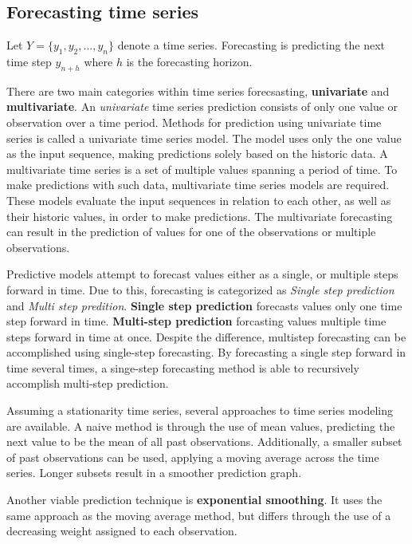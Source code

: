 \subsection{Forecasting time series}
\label{section:B&T:forecasting-time-series}
Let  $Y = \{y_1, y_2, ..., y_n\}$ denote a time series.
Forecasting is predicting the next time step $y_{n+h}$ where $h$ is the forecasting horizon.

There are two main categories within time series forecsasting, \textbf{univariate} and \textbf{multivariate}. 
An \textit{univariate} time series prediction consists of only one value or observation over a time period.
Methods for prediction using univariate time series is called a univariate time series model.
The model uses only the one value as the input sequence, making predictions solely based on the historic data.
A multivariate time series is a set of multiple values spanning a period of time.
To make predictions with such data, multivariate time series models are required.
These models evaluate the input sequences in relation to each other, as well as their historic values, in order to make predictions.
The multivariate forecasting can result in the prediction of values for one of the observations or multiple observations.


Predictive models attempt to forecast values either as a single, or multiple steps forward in time.
Due to this, forecasting is categorized as \textit{Single step prediction} and \textit{Multi step predition}.
\textbf{Single step prediction} forecasts values only one time step forward in time.
\textbf{Multi-step prediction} forcasting values multiple time steps forward in time at once.
Despite the difference, multistep forecasting can be accomplished using single-step forecasting.
By forecasting a single step forward in time several times, a singe-step forecasting method is able to recursively accomplish multi-step prediction.


Assuming a stationarity time series, several approaches to time series modeling are available.
A naive method is through the use of mean values, predicting the next value to be the mean of all past observations.
Additionally, a smaller subset of past observations can be used, applying a moving average across the time series.
Longer subsets result in a smoother prediction graph.

Another viable prediction technique is \textbf{exponential smoothing}.
It uses the same approach as the moving average method, but differs through the use of
a decreasing weight assigned to each observation.

